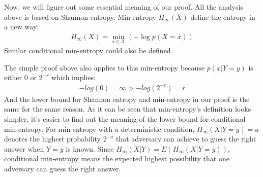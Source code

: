 \documentclass[10pt, conference, compsocconf]{IEEEtran}
\begin{document}
%
%

    Now, we will figure out some essential meaning of our proof.
    All the analysis above is based on Shannon entropy.
    Min-entropy $H_\infty(X)$ define the entropy in a new way:
    \begin{align*}
        H_\infty(X) = \min_{x \in \mathcal X} \left(-\log p\left(X = x\right) \right)
    \end{align*}
    Similar conditional min-entropy could also be defined.

    The simple proof above also applies to this min-entropy
    because $p(x | Y = y)$ is either $0$ or $2^{-r}$ which implies:
    \begin{align*}
        -log(0) = \infty > -log(2^{-r}) = r
    \end{align*}
    And the lower bound for Shannon entropy and min-entropy
    in our proof is the same for the same reason.
    As it can be seen that min-entropy's definition looks simpler,
    it's easier to find out the meaning of the lower
    bound for conditional min-entropy. For min-entropy with a deterministic condition,
    $H_\infty(X | Y = y) = a$
    denotes the highest probability $2^{-a}$ that adversary can achieve to guess
    the right answer when $Y = y$ is known.
    Since $H_\infty(X | Y) = E\left(H_\infty(X | Y = y)\right)$,
    conditional min-entropy means the expected highest
    possibility that one adversary can guess the right answer.
\end{document}

